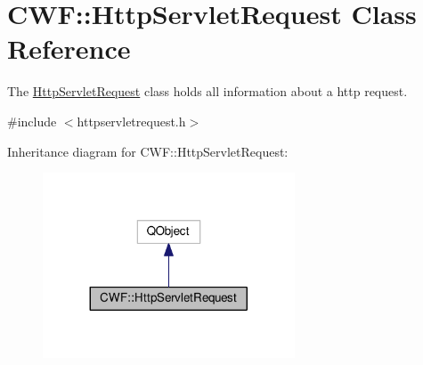 \hypertarget{class_c_w_f_1_1_http_servlet_request}{\section{C\+W\+F\+:\+:Http\+Servlet\+Request Class Reference}
\label{class_c_w_f_1_1_http_servlet_request}
}


The \hyperlink{class_c_w_f_1_1_http_servlet_request}{Http\+Servlet\+Request} class holds all information about a http request.  




{\ttfamily \#include $<$httpservletrequest.\+h$>$}



Inheritance diagram for C\+W\+F\+:\+:Http\+Servlet\+Request\+:
\nopagebreak
\begin{figure}[H]
\begin{center}
\leavevmode
\includegraphics[width=212pt]{class_c_w_f_1_1_http_servlet_request__inherit__graph}
\end{center}
\end{figure}
